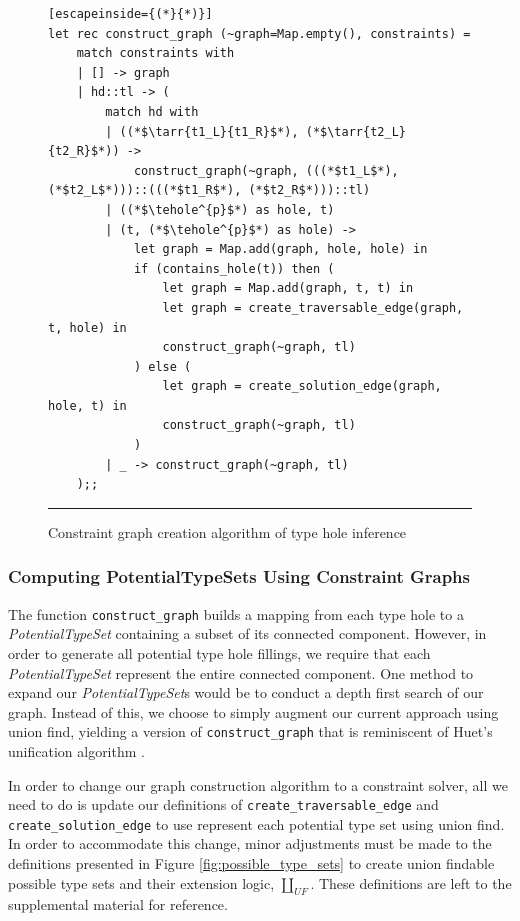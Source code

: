 \begin{figure}[hbt!]
\begin{lstlisting}[escapeinside={(*}{*)}]
let rec construct_graph (~graph=Map.empty(), constraints) =
    match constraints with
    | [] -> graph
    | hd::tl -> (
        match hd with
        | ((*$\tarr{t1_L}{t1_R}$*), (*$\tarr{t2_L}{t2_R}$*)) ->
            construct_graph(~graph, (((*$t1_L$*), (*$t2_L$*)))::(((*$t1_R$*), (*$t2_R$*)))::tl)
        | ((*$\tehole^{p}$*) as hole, t)
        | (t, (*$\tehole^{p}$*) as hole) ->
            let graph = Map.add(graph, hole, hole) in
            if (contains_hole(t)) then (
                let graph = Map.add(graph, t, t) in
                let graph = create_traversable_edge(graph, t, hole) in
                construct_graph(~graph, tl)
            ) else (
                let graph = create_solution_edge(graph, hole, t) in
                construct_graph(~graph, tl)
            )
        | _ -> construct_graph(~graph, tl)
    );;

\end{lstlisting}
\hrule
\caption{Constraint graph creation algorithm of type hole inference}
\label{fig:algcode_construct_graph}
\end{figure}

\subsubsection{Computing PotentialTypeSets Using Constraint Graphs} 
The function \lstinline{construct_graph} builds a mapping from each type hole to a \emph{PotentialTypeSet} containing a subset of its connected component. However, in order to generate all potential type hole fillings, we require that each \emph{PotentialTypeSet} represent the entire connected component. One method to expand our \emph{PotentialTypeSet}s would be to conduct a depth first search of our graph. Instead of this, we choose to simply augment our current approach using union find, yielding a version of \lstinline{construct_graph} that is reminiscent of Huet's unification algorithm \cite{Huet}.

In order to change our graph construction algorithm to a constraint solver, all we need to do is update our definitions of \lstinline{create_traversable_edge} and \lstinline{create_solution_edge} to use represent each potential type set using union find. In order to accommodate this change, minor adjustments must be made to the definitions presented in Figure \ref{fig:possible_type_sets} to create union findable possible type sets and their extension logic, $\amalg_{UF}$. These definitions are left to the supplemental material for reference.

